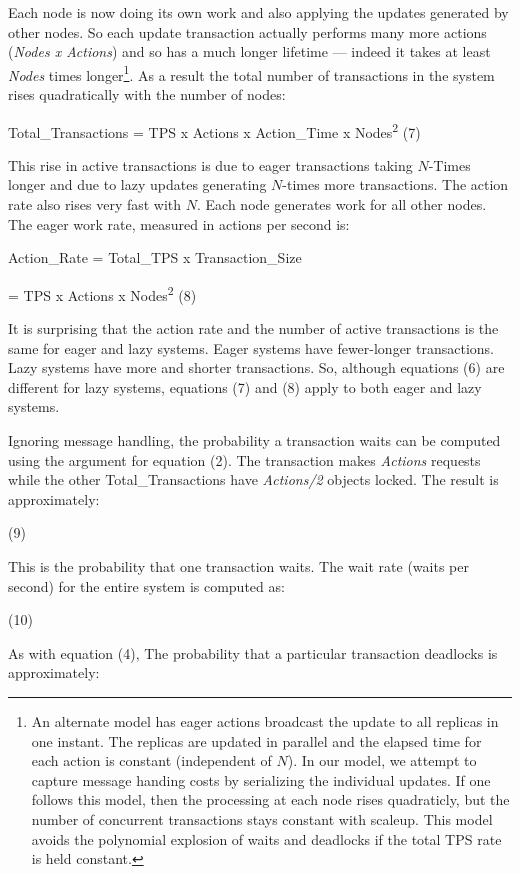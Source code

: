 \documentclass[a4paper,11pt,twoside,openright]{article}
\begin{document}
Each node is now doing its own work and also applying the updates
generated by other nodes. So each update transaction actually performs
many more actions (\emph{Nodes x Actions}) and so has a much longer
lifetime --- indeed it takes at least \emph{Nodes} times
longer\footnote{An alternate model has eager actions broadcast the
  update to all replicas in one instant. The replicas are updated in
  parallel and the elapsed time for each action is constant (independent
  of \(N\)). In our model, we attempt to capture message handing
  costs by serializing the individual updates. If one follows this
  model, then the processing at each node rises quadraticly, but the
  number of concurrent transactions stays constant with scaleup. This
  model avoids the polynomial explosion of waits and deadlocks if the
  total TPS rate is held constant.}. As a result the total number of
transactions in the system rises quadratically with the number of nodes:

Total\_Transactions = TPS x Actions x Action\_Time x
Nodes\textsuperscript{2} (7)

This rise in active transactions is due to eager transactions taking
\(N\)-Times longer and due to lazy updates generating \(N\)-times
more transactions. The action rate also rises very fast with \(N\).
Each node generates work for all other nodes. The eager work rate,
measured in actions per second is:

Action\_Rate = Total\_TPS x Transaction\_Size

= TPS x Actions x Nodes\textsuperscript{2} (8)

It is surprising that the action rate and the number of active
transactions is the same for eager and lazy systems. Eager systems have
fewer-longer transactions. Lazy systems have more and shorter
transactions. So, although equations (6) are different for lazy systems,
equations (7) and (8) apply to both eager and lazy systems.

Ignoring message handling, the probability a transaction waits can be
computed using the argument for equation (2). The transaction makes
\emph{Actions} requests while the other Total\_Transactions have
\emph{Actions/2} objects locked. The result is approximately:

(9)

This is the probability that one transaction waits. The wait rate (waits
per second) for the entire system is computed as:

(10)

As with equation (4), The probability that a particular transaction
deadlocks is approximately:
\end{document}
